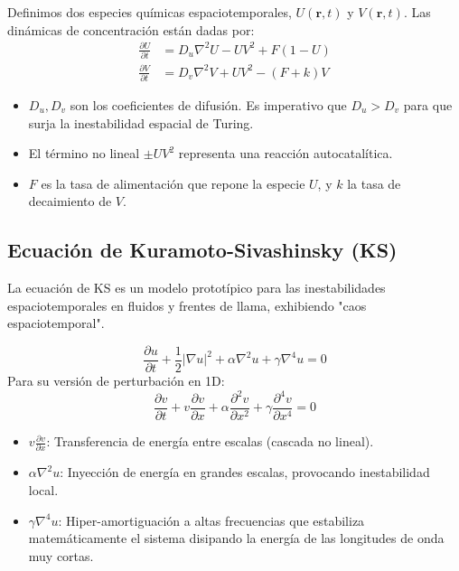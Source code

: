 \documentclass[12pt, openany]{book}
\begin{document}
Definimos dos especies químicas espaciotemporales, $U(\mathbf{r}, t)$ y $V(\mathbf{r}, t)$. Las dinámicas de concentración están dadas por:
\begin{align}
    \frac{\partial U}{\partial t} &= D_u \nabla^2 U - U V^2 + F(1 - U) \\
    \frac{\partial V}{\partial t} &= D_v \nabla^2 V + U V^2 - (F + k) V
\end{align}
\begin{itemize}
    \item $D_u, D_v$ son los coeficientes de difusión. Es imperativo que $D_u > D_v$ para que surja la inestabilidad espacial de Turing.
    \item El término no lineal $\pm UV^2$ representa una reacción autocatalítica.
    \item $F$ es la tasa de alimentación que repone la especie $U$, y $k$ la tasa de decaimiento de $V$.
\end{itemize}

\subsection{Ecuación de Kuramoto-Sivashinsky (KS)}

La ecuación de KS es un modelo prototípico para las inestabilidades espaciotemporales en fluidos y frentes de llama, exhibiendo "caos espaciotemporal".

\begin{equation}
    \frac{\partial u}{\partial t} + \frac{1}{2} |\nabla u|^2 + \alpha \nabla^2 u + \gamma \nabla^4 u = 0
\end{equation}
Para su versión de perturbación en 1D:
\begin{equation}
    \frac{\partial v}{\partial t} + v \frac{\partial v}{\partial x} + \alpha \frac{\partial^2 v}{\partial x^2} + \gamma \frac{\partial^4 v}{\partial x^4} = 0
\end{equation}
\begin{itemize}
    \item $v \frac{\partial v}{\partial x}$: Transferencia de energía entre escalas (cascada no lineal).
    \item $\alpha \nabla^2 u$: Inyección de energía en grandes escalas, provocando inestabilidad local.
    \item $\gamma \nabla^4 u$: Hiper-amortiguación a altas frecuencias que estabiliza matemáticamente el sistema disipando la energía de las longitudes de onda muy cortas.
\end{itemize}
\end{document}

